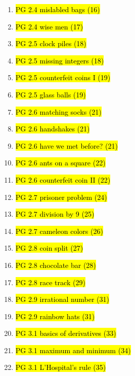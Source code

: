 \documentclass[11pt]{article}
\newenvironment{note}{\begin{enumerate}[leftmargin=1em,topsep=0pt,noitemsep]}{\end{enumerate}}
\begin{document}
\begin{spacing}{1.1}
\begin{note}
\item \hl{PG 2.4 mislabled bags (16)}

\item \hl{PG 2.4 wise men (17)}

\item \hl{PG 2.5 clock piles (18)}

\item \hl{PG 2.5 missing integers (18)}

\item \hl{PG 2.5 counterfeit coins I (19)}

\item \hl{PG 2.5 glass balls (19)}

\item \hl{PG 2.6 matching socks (21)}

\item \hl{PG 2.6 handshakes (21)}

\item \hl{PG 2.6 have we met before? (21)}

\item \hl{PG 2.6 ants on a square (22)}

\item \hl{PG 2.6 counterfeit coin II (22)}

\item \hl{PG 2.7 prisoner problem (24)}

\item \hl{PG 2.7 division by 9 (25)}

\item \hl{PG 2.7 cameleon colors (26)}

\item \hl{PG 2.8 coin split (27)}

\item \hl{PG 2.8 chocolate bar (28)}

\item \hl{PG 2.8 race track (29)}

\item \hl{PG 2.9 irrational number (31)}

\item \hl{PG 2.9 rainbow hats (31)}

\item \hl{PG 3.1 basics of derivatives (33)}

\item \hl{PG 3.1 maximum and minimum (34)}

\item \hl{PG 3.1 L'Hospital's rule (35)}


\end{note}
\end{spacing}
\end{document}
